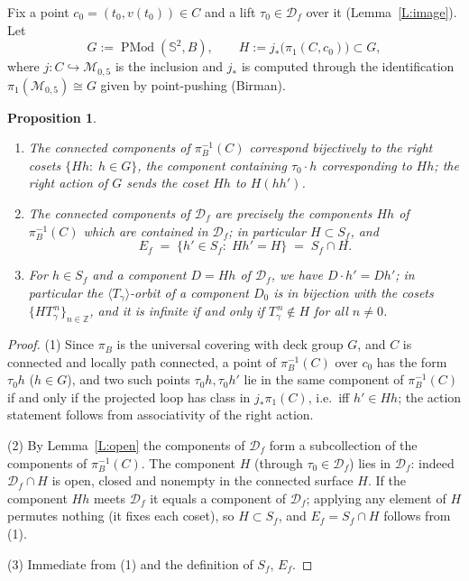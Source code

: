 \documentclass[11pt]{amsart}
\newtheorem{proposition}[theorem]{Proposition}
\newcommand{\Sph}{\mathbb{S}^{2}}
\newcommand{\PMod}{\operatorname{PMod}}
\newcommand{\Def}{\mathcal{D}}
\begin{document}
Fix a point $c_0=(t_0,v(t_0))\in C$ and a lift $\tau_0\in\Def_f$ over it
(Lemma~\ref{L:image}). Let
\[
G:=\PMod(\Sph,B),\qquad
H:=j_*\bigl(\pi_1(C,c_0)\bigr)\subset G,
\]
where $j:C\hookrightarrow\mathcal{M}_{0,5}$ is the inclusion and
$j_*$ is computed through the identification
$\pi_1(\mathcal{M}_{0,5})\cong G$ given by point-pushing (Birman).

\begin{proposition}\label{P:cosets}
\begin{enumerate}
\item The connected components of $\pi_B^{-1}(C)$ correspond bijectively to
the right cosets $\{Hh:\;h\in G\}$, the component containing $\tau_0\cdot h$
corresponding to $Hh$; the right action of $G$ sends the coset $Hh$ to
$H(hh')$.
\item The connected components of $\Def_f$ are precisely the components
$Hh$ of $\pi_B^{-1}(C)$ which are contained in $\Def_f$; in particular
$H\subset S_f$, and
\[
E_f\;=\;\{h'\in S_f:\;Hh'=H\}\;=\;S_f\cap H .
\]
\item For $h\in S_f$ and a component $D=Hh$ of $\Def_f$, we have
$D\cdot h'=Dh'$; in particular the $\langle T_\gamma\rangle$-orbit of a
component $D_0$ is in bijection with the cosets
$\{HT_\gamma^{\,n}\}_{n\in\mathbb{Z}}$, and it is infinite if and only if
$T_\gamma^{\,n}\notin H$ for all $n\ne 0$.
\end{enumerate}
\end{proposition}

\begin{proof}
(1) Since $\pi_B$ is the universal covering with deck group $G$, and $C$
is connected and locally path connected, a point of
$\pi_B^{-1}(C)$ over $c_0$ has the form $\tau_0 h$ ($h\in G$), and two such
points $\tau_0h,\tau_0h'$ lie in the same component of $\pi_B^{-1}(C)$ if
and only if the projected loop has class in $j_*\pi_1(C)$, i.e.\ iff
$h'\in Hh$; the action statement follows from associativity of the right
action.

(2) By Lemma~\ref{L:open} the components of $\Def_f$ form a subcollection
of the components of $\pi_B^{-1}(C)$. The component $H$ (through
$\tau_0\in\Def_f$) lies in $\Def_f$: indeed $\Def_f\cap H$ is open, closed
and nonempty in the connected surface $H$. If the component $Hh$ meets
$\Def_f$ it equals a component of $\Def_f$; applying any element of $H$
permutes nothing (it fixes each coset), so $H\subset S_f$, and
$E_f=S_f\cap H$ follows from (1).

(3) Immediate from (1) and the definition of $S_f$, $E_f$.
\end{proof}
\end{document}
